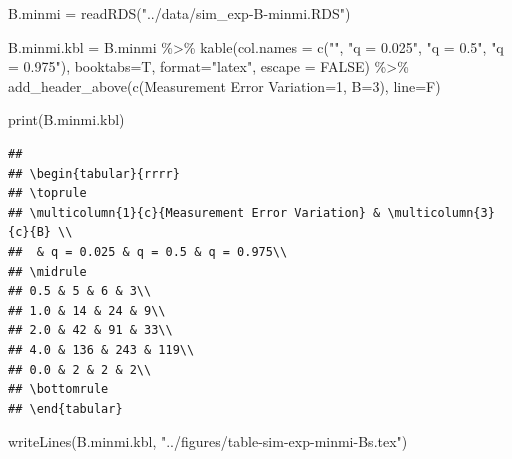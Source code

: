 \documentclass[
]{article}
\newenvironment{Shaded}{\begin{snugshade}}{\end{snugshade}}
\newcommand{\AttributeTok}[1]{\textcolor[rgb]{0.77,0.63,0.00}{#1}}
\newcommand{\ConstantTok}[1]{\textcolor[rgb]{0.00,0.00,0.00}{#1}}
\newcommand{\DecValTok}[1]{\textcolor[rgb]{0.00,0.00,0.81}{#1}}
\newcommand{\FunctionTok}[1]{\textcolor[rgb]{0.00,0.00,0.00}{#1}}
\newcommand{\NormalTok}[1]{#1}
\newcommand{\OtherTok}[1]{\textcolor[rgb]{0.56,0.35,0.01}{#1}}
\newcommand{\SpecialCharTok}[1]{\textcolor[rgb]{0.00,0.00,0.00}{#1}}
\newcommand{\StringTok}[1]{\textcolor[rgb]{0.31,0.60,0.02}{#1}}
\begin{document}
\begin{Shaded}
\begin{Highlighting}[]
\NormalTok{B.minmi }\OtherTok{=} \FunctionTok{readRDS}\NormalTok{(}\StringTok{"../data/sim\_exp{-}B{-}minmi.RDS"}\NormalTok{)}
  
\NormalTok{B.minmi.kbl }\OtherTok{=}\NormalTok{ B.minmi }\SpecialCharTok{\%\textgreater{}\%}
  \FunctionTok{kable}\NormalTok{(}\AttributeTok{col.names =} \FunctionTok{c}\NormalTok{(}\StringTok{""}\NormalTok{, }\StringTok{"q = 0.025"}\NormalTok{, }\StringTok{"q = 0.5"}\NormalTok{, }\StringTok{"q = 0.975"}\NormalTok{),}
        \AttributeTok{booktabs=}\NormalTok{T, }\AttributeTok{format=}\StringTok{"latex"}\NormalTok{, }\AttributeTok{escape =} \ConstantTok{FALSE}\NormalTok{) }\SpecialCharTok{\%\textgreater{}\%}
  \FunctionTok{add\_header\_above}\NormalTok{(}\FunctionTok{c}\NormalTok{(}\StringTok{\textasciigrave{}}\AttributeTok{Measurement Error Variation}\StringTok{\textasciigrave{}}\OtherTok{=}\DecValTok{1}\NormalTok{, }\AttributeTok{B=}\DecValTok{3}\NormalTok{), }\AttributeTok{line=}\NormalTok{F)}

\FunctionTok{print}\NormalTok{(B.minmi.kbl)}
\end{Highlighting}
\end{Shaded}

\begin{verbatim}
## 
## \begin{tabular}{rrrr}
## \toprule
## \multicolumn{1}{c}{Measurement Error Variation} & \multicolumn{3}{c}{B} \\
##  & q = 0.025 & q = 0.5 & q = 0.975\\
## \midrule
## 0.5 & 5 & 6 & 3\\
## 1.0 & 14 & 24 & 9\\
## 2.0 & 42 & 91 & 33\\
## 4.0 & 136 & 243 & 119\\
## 0.0 & 2 & 2 & 2\\
## \bottomrule
## \end{tabular}
\end{verbatim}

\begin{Shaded}
\begin{Highlighting}[]
\FunctionTok{writeLines}\NormalTok{(B.minmi.kbl, }
           \StringTok{"../figures/table{-}sim{-}exp{-}minmi{-}Bs.tex"}\NormalTok{)}
\end{Highlighting}
\end{Shaded}
\end{document}
